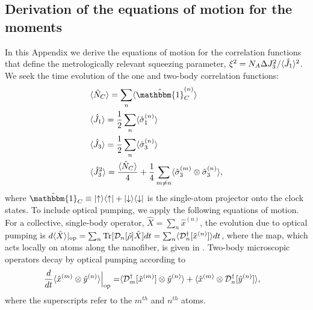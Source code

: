 \documentclass[preprint, aps,pra,onecolumn]{revtex4-1} %
\begin{document}
\begin{appendix}
\section{Derivation of the equations of motion for the moments} \label{Appendix::OpticalPumping}	

In this Appendix we derive the equations of motion for the correlation functions that define the metrologically relevant squeezing parameter, $\xi^2 = N_A \Delta J_3^2/\langle{\hat{J}_1}\rangle^2$.  
We seek the time evolution of the one and two-body correlation functions:
\begin{subequations}
\begin{align}
&\expt{\hat{N}_C} = \sum_n \expt{\hat{\mathbbm{1}}^{(n)}_C} \\
&\expt{\hat{J}_1} = \frac{1}{2} \sum_n \expt{\hat{\sigma}_1^{(n)}} \\
&\expt{\hat{J}_3} = \frac{1}{2} \sum_n \expt{\hat{\sigma}_3^{(n)}} \\
&\expt{\hat{J}_3^2} = \frac{\expt{\hat{N}_C}}{4} +\frac{1}{4} \sum_{m \neq n} \expt{\hat{\sigma}_3^{(m)}\otimes \hat{\sigma}_3^{(n)}}, 
\end{align}
\end{subequations}
where $\hat{\mathbbm{1}}_C \equiv \op{\uparrow}{\uparrow} + \op{\downarrow}{\downarrow}$ is the single-atom projector onto the clock states. 
To include optical pumping, we apply the following equations of motion. For a collective, single-body operator, $\hat{X} = \sum_n \hat{x}^{(n)}$, the evolution due to optical pumping is $d\langle{ \hat{X}}\rangle|_{\rm op} = \sum_n \mbox{Tr} [\mathcal{D}_n[\hat{\rho}]\hat{X} ]dt = \sum_n \langle{\mathcal{D}_n^\dagger[\hat{x}^{(n)}]}\rangle dt$, where the map, which acts locally on atoms along the nanofiber, is given in .  
Two-body microscopic operators decay by optical pumping according to \cite{baragiola_three-dimensional_2014}
	\begin{align} \label{Eq::TwoBodyDecay}
		\frac{d}{dt} \langle{ \hat{x}^{(m)} \otimes \hat{y}^{(n)} }\rangle \Big|_{\rm op}= &\langle{ \mathcal{D}_m^\dagger[ \hat{x}^{(m)}] \otimes \hat{y}^{(n)} }\rangle + \langle{ \hat{x}^{(m)}\otimes \mathcal{D}_n^\dagger[ \hat{y}^{(n)}] }\rangle,
	\end{align}
where the superscripts refer to the $m^{th}$ and $n^{th}$ atoms. 


\end{appendix}
\end{document}

